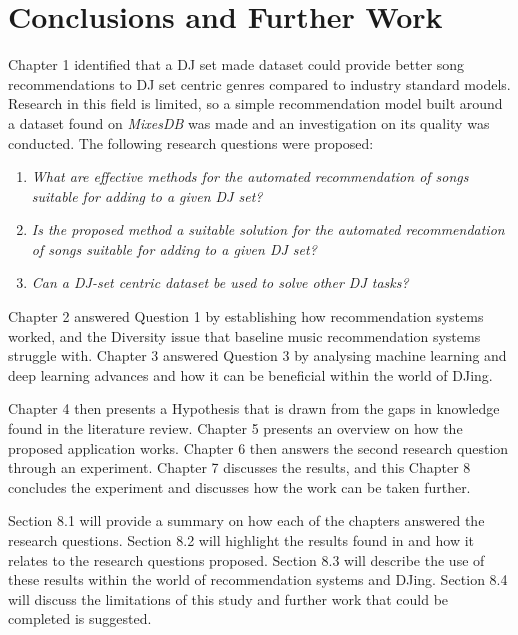 
\graphicspath{{Chapter7/}}

\chapter{Conclusions and Further Work} 

Chapter 1 identified that a DJ set made dataset could provide better song recommendations to DJ set centric genres compared to industry standard models. Research in this field is limited, so a simple recommendation model built around a dataset found on \textit{MixesDB} was made and an investigation on its quality was conducted. The following research questions were proposed:

\begin{enumerate}
	\item \textit{What are effective methods for the automated recommendation of songs suitable
		for adding to a given DJ set?}
	\item \textit{Is the proposed method a suitable solution for the automated recommendation of songs suitable for adding to a given DJ set?}
	\item \textit{Can a DJ-set centric dataset be used to solve other DJ tasks?}
\end{enumerate}

Chapter 2 answered Question 1 by establishing how recommendation systems worked, and the Diversity issue that baseline music recommendation systems struggle with. Chapter 3 answered Question 3 by analysing machine learning and deep learning advances and how it can be beneficial within the world of DJing. 

Chapter 4 then presents a Hypothesis that is drawn from the gaps in knowledge found in the literature review. Chapter 5 presents an overview on how the proposed application works. Chapter 6 then answers the second research question through an experiment. Chapter 7 discusses the results, and this Chapter 8 concludes the experiment and discusses how the work can be taken further.

Section 8.1 will provide a summary on how each of the chapters answered the research questions.
Section 8.2 will highlight the results found in and how it relates to the research questions proposed. Section 8.3 will describe the use of these results within the world of  recommendation systems and DJing. Section 8.4 will discuss the limitations of
this  study and  further work that could be completed is suggested.

